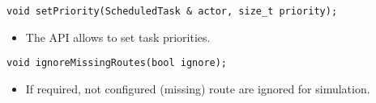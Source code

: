 \begin{frame}[fragile=singleslide]
\begin{lstlisting}
void setPriority(ScheduledTask & actor, size_t priority);
\end{lstlisting}
\begin{itemize}
\item The API allows to set task priorities.
\end{itemize}
\begin{lstlisting}
void ignoreMissingRoutes(bool ignore);
\end{lstlisting}
\begin{itemize}
\item If required, not configured (missing) route are ignored for simulation.
\end{itemize}
\end{frame}



